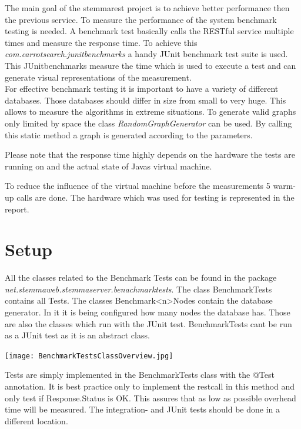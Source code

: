 \documentclass[11pt,fleqn,openany]{book} %
\begin{document}
The main goal of the stemmarest project is to achieve better performance then the previous service. To measure the performance of the system benchmark testing is needed. A benchmark test basically calls the RESTful service multiple times and measure the response time. To achieve this \textit{com.carrotsearch.junitbenchmarks} a handy JUnit benchmark test suite is used. This JUnitbenchmarks measure the time which is used to execute a test and can generate visual representations of the measurement.\\
For effective benchmark testing it is important to have a variety of different databases. Those databases should differ in size from small to very huge. This allows to measure the algorithms in extreme situations.
To generate valid graphs only limited by space the class \textit{RandomGraphGenerator} can be used. By calling this static method a graph is generated according to the parameters.\\
\begin{remark}
Please note that the response time highly depends on the hardware the tests are running on and the actual state of Javas virtual machine. 
\end{remark}
To reduce the influence of the virtual machine before the measurements 5 warm-up calls are done. The hardware which was used for testing is represented in the report.

\section*{Setup}
All the classes related to the Benchmark Tests can be found in the package \\ \textit{net.stemmaweb.stemmaserver.benachmarktests}. The class BenchmarkTests contains all Tests. The classes Benchmark<n>Nodes contain the database generator. In it it is being configured how many nodes the database has. Those are also the classes which run with the JUnit test. BenchmarkTests cant be run as a JUnit test as it is an abstract class.

\begin{center}
\texttt{[image: BenchmarkTestsClassOverview.jpg]} 
\end{center}

Tests are simply implemented in the BenchmarkTests class with the @Test annotation. It is best practice only to implement the restcall in this method and only test if Response.Status is OK. This assures that as low as possible overhead time will be measured. The integration- and JUnit tests should be done in a different location.
\end{document}
